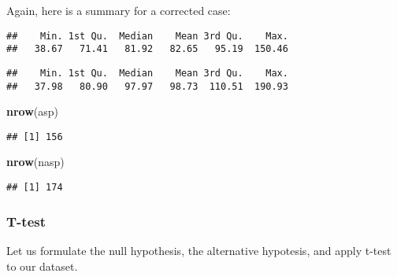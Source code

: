 \documentclass[]{article}
\newenvironment{Shaded}{\begin{snugshade}}{\end{snugshade}}
\newcommand{\KeywordTok}[1]{\textcolor[rgb]{0.13,0.29,0.53}{\textbf{#1}}}
\newcommand{\OperatorTok}[1]{\textcolor[rgb]{0.81,0.36,0.00}{\textbf{#1}}}
\newcommand{\NormalTok}[1]{#1}
\begin{document}
Again, here is a summary for a corrected case:

\begin{Shaded}
\end{Shaded}

\begin{verbatim}
##    Min. 1st Qu.  Median    Mean 3rd Qu.    Max. 
##   38.67   71.41   81.92   82.65   95.19  150.46
\end{verbatim}

\begin{Shaded}
\end{Shaded}

\begin{verbatim}
##    Min. 1st Qu.  Median    Mean 3rd Qu.    Max. 
##   37.98   80.90   97.97   98.73  110.51  190.93
\end{verbatim}

\begin{Shaded}
\begin{Highlighting}[]
\KeywordTok{nrow}\NormalTok{(asp)}
\end{Highlighting}
\end{Shaded}

\begin{verbatim}
## [1] 156
\end{verbatim}

\begin{Shaded}
\begin{Highlighting}[]
\KeywordTok{nrow}\NormalTok{(nasp)}
\end{Highlighting}
\end{Shaded}

\begin{verbatim}
## [1] 174
\end{verbatim}

\subsubsection{T-test}\label{t-test}

Let us formulate the null hypothesis, the alternative hypotesis, and
apply t-test to our dataset.
\end{document}
